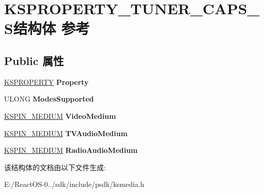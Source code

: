 \hypertarget{struct_k_s_p_r_o_p_e_r_t_y___t_u_n_e_r___c_a_p_s___s}{}\section{K\+S\+P\+R\+O\+P\+E\+R\+T\+Y\+\_\+\+T\+U\+N\+E\+R\+\_\+\+C\+A\+P\+S\+\_\+\+S结构体 参考}
\label{struct_k_s_p_r_o_p_e_r_t_y___t_u_n_e_r___c_a_p_s___s}
\subsection*{Public 属性}
\begin{DoxyCompactItemize}
\item 
\mbox{\label{struct_k_s_p_r_o_p_e_r_t_y___t_u_n_e_r___c_a_p_s___s_a58b90a729413b011ba1b1400e68bb593}} 
\hyperlink{struct_k_s_i_d_e_n_t_i_f_i_e_r}{K\+S\+P\+R\+O\+P\+E\+R\+TY} {\bfseries Property}
\item 
\mbox{\label{struct_k_s_p_r_o_p_e_r_t_y___t_u_n_e_r___c_a_p_s___s_a915de943958c3543844f91eaa7e860c1}} 
U\+L\+O\+NG {\bfseries Modes\+Supported}
\item 
\mbox{\label{struct_k_s_p_r_o_p_e_r_t_y___t_u_n_e_r___c_a_p_s___s_a8af71eca0c8cf663f772c10782f0de54}} 
\hyperlink{struct_k_s_i_d_e_n_t_i_f_i_e_r}{K\+S\+P\+I\+N\+\_\+\+M\+E\+D\+I\+UM} {\bfseries Video\+Medium}
\item 
\mbox{\label{struct_k_s_p_r_o_p_e_r_t_y___t_u_n_e_r___c_a_p_s___s_a491253242a94daaeeed66e3168630b02}} 
\hyperlink{struct_k_s_i_d_e_n_t_i_f_i_e_r}{K\+S\+P\+I\+N\+\_\+\+M\+E\+D\+I\+UM} {\bfseries T\+V\+Audio\+Medium}
\item 
\mbox{\label{struct_k_s_p_r_o_p_e_r_t_y___t_u_n_e_r___c_a_p_s___s_a7d82500fa94f509ab8c30c4f78676eb4}} 
\hyperlink{struct_k_s_i_d_e_n_t_i_f_i_e_r}{K\+S\+P\+I\+N\+\_\+\+M\+E\+D\+I\+UM} {\bfseries Radio\+Audio\+Medium}
\end{DoxyCompactItemize}


该结构体的文档由以下文件生成\+:\begin{DoxyCompactItemize}
\item 
E\+:/\+React\+O\+S-\/0../sdk/include/psdk/ksmedia.\+h\end{DoxyCompactItemize}
